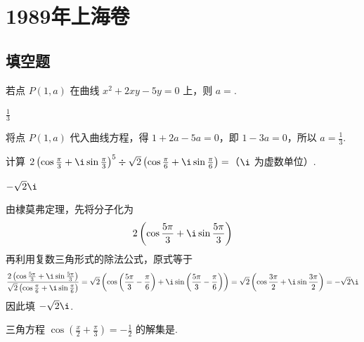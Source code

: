 \documentclass[UTF8,a4paper,oneside,11pt]{ctexbook}
\begin{document}
\mainmatter


\chapter{1989年上海卷}

\section{填空题}

\begin{problem}
若点 \(P(1,a)\) 在曲线 \(x^2+2xy-5y=0\) 上，则 \(a=\)\fillinblank{}.
\end{problem}

\begin{answer}
\(\frac{1}{3}\)
\end{answer}

\begin{solution}
将点 \(P(1,a)\) 代入曲线方程，得 \(1+2a-5a=0\)，即 \(1-3a=0\)，所以 \(a=\frac{1}{3}\).
\end{solution}

\begin{problem}
计算 \(2\left( \cos \frac{\pi}{3}+\i \sin \frac{\pi}{3} \right)^5\div \sqrt{2}\left( \cos \frac{\pi}{6}+\i \sin \frac{\pi}{6} \right)=\)\fillinblank{}（\(\i\) 为虚数单位）.
\end{problem}

\begin{answer}
\(-\sqrt{2}\i\)
\end{answer}

\begin{solution}
由棣莫弗定理，先将分子化为
\[
2\left(\cos\frac{5\pi}{3}+\i\sin\frac{5\pi}{3}\right)
\]
再利用复数三角形式的除法公式，原式等于
\[
\frac{2\left(\cos\frac{5\pi}{3}+\i\sin\frac{5\pi}{3}\right)}{\sqrt{2}\left(\cos\frac{\pi}{6}+\i\sin\frac{\pi}{6}\right)}
=\sqrt{2}\left(\cos\left(\frac{5\pi}{3}-\frac{\pi}{6}\right)+\i\sin\left(\frac{5\pi}{3}-\frac{\pi}{6}\right)\right)
=\sqrt{2}\left(\cos\frac{3\pi}{2}+\i\sin\frac{3\pi}{2}\right)=-\sqrt{2}\i
\]
因此填 \(-\sqrt{2}\i\).
\end{solution}

\begin{problem}
三角方程 \(\cos\left( \frac{x}{2}+\frac{\pi}{3} \right)=-\frac{1}{2}\) 的解集是\fillinblank{}.
\end{problem}
\end{document}
